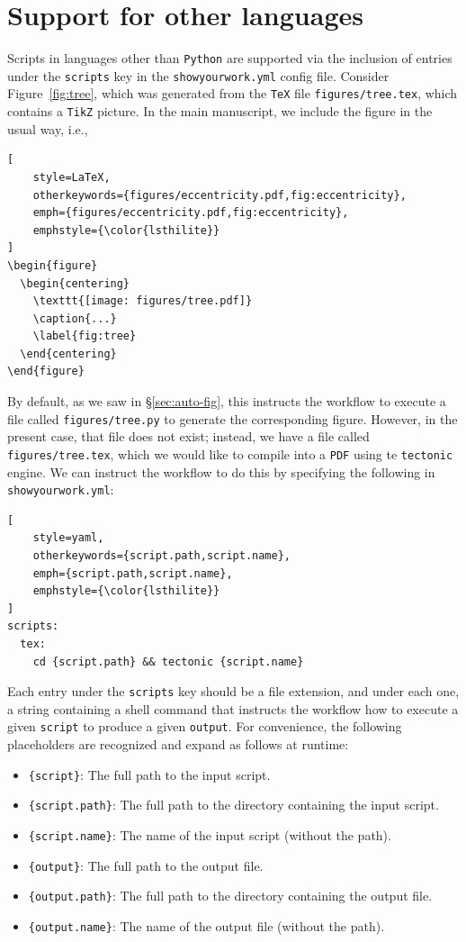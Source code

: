 \documentclass[twocolumn]{aastex631}
\begin{document}
\section{Support for other languages}
\label{sec:other-lang}
%
Scripts in languages other than \texttt{Python} are supported via the inclusion of entries under the \texttt{scripts} key in the \texttt{showyourwork.yml} config file. 
Consider Figure~\ref{fig:tree}, which was generated from the \texttt{TeX} file \texttt{figures/tree.tex}, which contains a \texttt{TikZ} picture. 
In the main manuscript, we include the figure in the usual way, i.e.,
%
\begin{lstlisting}[
    style=LaTeX,
    otherkeywords={figures/eccentricity.pdf,fig:eccentricity},
    emph={figures/eccentricity.pdf,fig:eccentricity},
    emphstyle={\color{lsthilite}}
]
\begin{figure}
  \begin{centering}
    \texttt{[image: figures/tree.pdf]}
    \caption{...}
    \label{fig:tree}
  \end{centering}
\end{figure}
\end{lstlisting}
%
By default, as we saw in \S\ref{sec:auto-fig}, this instructs the workflow to execute a file called \texttt{figures/tree.py} to generate the corresponding figure. 
However, in the present case, that file does not exist; instead, we have a file called \texttt{figures/tree.tex}, which we would like to compile into a \texttt{PDF} using te \texttt{tectonic} engine.
We can instruct the workflow to do this by specifying the following in \texttt{showyourwork.yml}:
%
\begin{lstlisting}[
    style=yaml,
    otherkeywords={script.path,script.name},
    emph={script.path,script.name},
    emphstyle={\color{lsthilite}}
]
scripts:
  tex:
    cd {script.path} && tectonic {script.name}
\end{lstlisting}
%
Each entry under the \texttt{scripts} key should be a file extension, and under each one, a string containing a shell command that instructs the workflow how to execute a given {\color{lsthilite}\texttt{script}} to produce a given {\color{lsthilite}\texttt{output}}.
For convenience, the following placeholders are recognized and expand as follows at runtime:
%
\begin{itemize}
\item \texttt{\{script\}}: The full path to the input script.
\item \texttt{\{script.path\}}: The full path to the directory containing the input script.
\item \texttt{\{script.name\}}: The name of the input script (without the path).
\item \texttt{\{output\}}: The full path to the output file.
\item \texttt{\{output.path\}}: The full path to the directory containing the output file.
\item \texttt{\{output.name\}}: The name of the output file (without the path).
\end{itemize}
\end{document}
